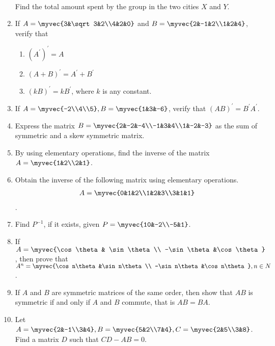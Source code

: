 \begin{enumerate}
\\ Find the total amount spent by the group in the two cities $X$ and $Y$.
\item If $A=\myvec{3&\sqrt3&2\\4&2&0}$ and $B=\myvec{2&-1&2\\1&2&4}$, verify that 
\begin{enumerate}
\item $(A^{\prime})^{\prime}=A$
\item $(A+B)^{\prime}=A^{\prime}+B^{\prime}$
\item $(kB)^{\prime}=kB^{\prime}$, where $k$ is any constant.
\end{enumerate}
\item If $A=\myvec{-2\\4\\5}, B=\myvec{1&3&-6}$, verify that $(AB)^{\prime}=B^{\prime}A^{\prime}$.
\item Express the matrix $B=\myvec{2&-2&-4\\-1&3&4\\1&-2&-3}$ as the sum of symmetric and a skew symmetric matrix.
\item By using elementary operations, find the inverse of the matrix $A=\myvec{1&2\\2&1}$.
\item Obtain the inverse of the following matrix using elementary operations. 
\begin{align}A=\myvec{0&1&2\\1&2&3\\3&1&1} \end{align}.
\item Find $P^{-1}$, if it exists, given $P=\myvec{10&-2\\-5&1}$.
\item If $A=\myvec{\cos \theta& \sin \theta\\ -\sin \theta&\cos\theta}$, then prove that $A^n=\myvec{\cos n\theta&\sin n\theta\\ -\sin n\theta&\cos n\theta}, n\in N$.
\item If $A$ and $B$ are symmetric matrices of the same order, then show that $AB$ is symmetric if and only if $A$ and $B$ commute, that is $AB=BA$.
\item Let $A=\myvec{2&-1\\3&4}, B=\myvec{5&2\\7&4}, C=\myvec{2&5\\3&8}$. Find a matrix $D$ such that $CD-AB=0$.
\end{enumerate}
